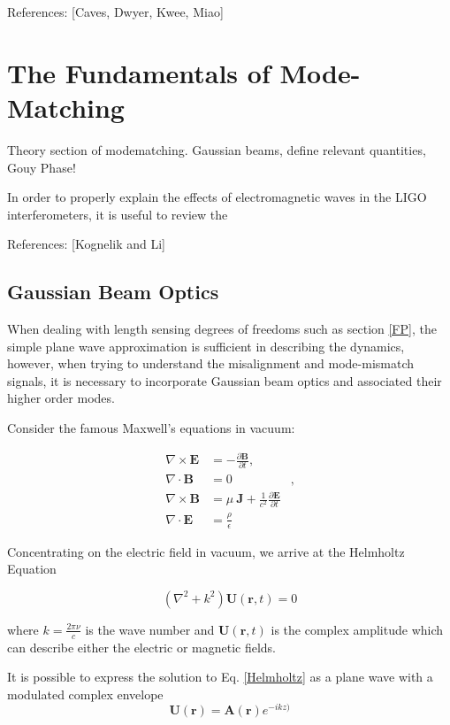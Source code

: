 \documentclass[oneside]{book}
\begin{document}
	References: [Caves, Dwyer, Kwee, Miao]
		
\chapter{The Fundamentals of Mode-Matching}
	Theory section of modematching. Gaussian beams, define relevant quantities, Gouy Phase!
	
	In order to properly explain the effects of electromagnetic waves in the LIGO interferometers, it is useful to review the 
	
	References: [Kognelik and Li]
	
		\section{Gaussian Beam Optics}
		When dealing with length sensing degrees of freedoms such as section \ref{FP}, the simple plane wave approximation is sufficient in describing the dynamics, however, when trying to understand the misalignment and mode-mismatch signals, it is necessary to incorporate Gaussian beam optics and associated their higher order modes.

		
		Consider the famous Maxwell's equations in vacuum:
		
		\begin{equation}
		\label{18.1:1}
		\begin{aligned}
		 \nabla \times \mathbf{E} &=-\frac{\partial \mathbf{B}} {\partial t},&
		\\\nabla \cdot \mathbf{B} &=0&,
		\\\nabla \times \mathbf{B} &= \mu\ \mathbf{J} + \frac{1}{c^2} \frac{\partial \mathbf{E}} {\partial t}&
		\\
		\nabla \cdot \mathbf{E} &= \frac{\rho}{\epsilon}&
		\end{aligned}
		\end{equation}
		
		
		Concentrating on the electric field in vacuum, we arrive at the Helmholtz Equation
		
		\begin{equation}\label{Helmholtz}
		(\nabla^2 + k^2 ) \mathbf{U}(\mathbf{r},t) = 0
		\end{equation}
	
		
		where $k=\frac{2\pi\nu}{c}$ is the wave number and $\mathbf{U}(\mathbf{r},t)$ is the complex amplitude which can describe either the electric or magnetic fields.  
		
		It is possible to express the solution to Eq. \ref{Helmholtz} as
		a plane wave with a modulated complex envelope
		\begin{equation}
		\mathbf{U}(\mathbf{r}) = \mathbf{A}(\mathbf{r}) e^{-ikz)}
		\end{equation}
		
\end{document}
